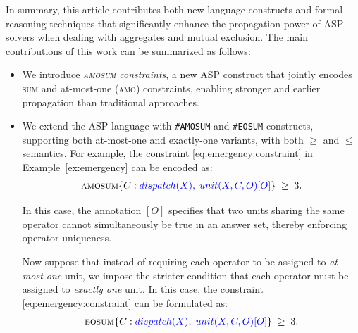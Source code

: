 \documentclass[preprint,authoryear]{elsarticle}
\theoremstyle{definition}
\def\amosum{\ensuremath{\textsc{amosum}}\xspace}
\def\eosum{\ensuremath{\textsc{eosum}}\xspace}
\begin{document}
In summary, this article contributes both new language constructs and formal reasoning techniques that significantly enhance the propagation power of ASP solvers when dealing with aggregates and mutual exclusion.
The main contributions of this work can be summarized as follows:
\begin{itemize}
\item
We introduce \emph{\textsc{amosum} constraints}, a new ASP construct that jointly encodes \textsc{sum} and at-most-one (\textsc{amo}) constraints, enabling stronger and earlier propagation than traditional approaches.

\item 
We extend the ASP language with \texttt{\#AMOSUM} and \texttt{\#EOSUM} constructs, supporting both at-most-one and exactly-one variants, with both $\geq$ and $\leq$ semantics.
For example, the constraint  \eqref{eq:emergency:constraint} in Example~\ref{ex:emergency} can be encoded as:
\begin{align*}
    \amosum\{C : \textcolor{blue}{dispatch(X), \;unit(X,C,O) [O]}\} \;\geq\; 3.
\end{align*}

In this case, the annotation $[O]$ specifies that two units sharing the same operator cannot simultaneously be true in an answer set, thereby enforcing operator uniqueness.

Now suppose that instead of requiring each operator to be assigned to \textit{at most one} unit, we impose the stricter condition that each operator must be assigned to \textit{exactly one} unit.  
In this case, the constraint \eqref{eq:emergency:constraint} can be formulated as:
\begin{align*}
    \eosum\{C : \textcolor{blue}{dispatch(X), \;unit(X,C,O) [O]}\} \;\geq\; 3.
\end{align*}


\end{itemize}
\end{document}

